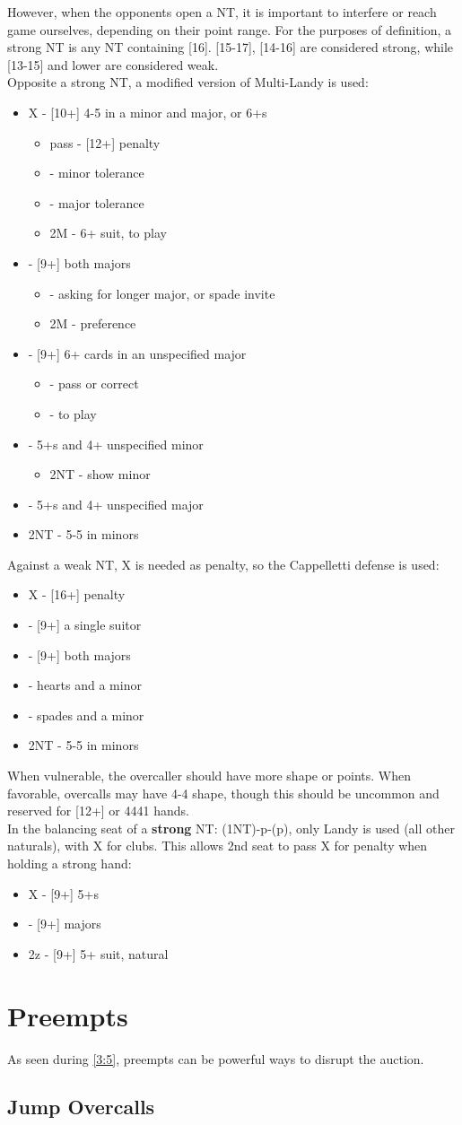 \documentclass[12pt]{report}
\newcommand{\n}{\\}
\newcommand{\ul}[1]{\begin{itemize}#1\end{itemize}}
\newcommand{\li}{\item[~]}
\begin{document}
    However, when the opponents open a NT, it is important to interfere or reach game ourselves, depending on their point range.  For the purposes of definition, a strong NT is any NT containing [16].  [15-17], [14-16] are considered strong, while [13-15] and lower are considered weak. \n

    Opposite a strong NT, a modified version of Multi-Landy is used:
    \ul {
        \li X - [10+] 4-5 in a minor and major, or 6+\di{}s
        \ul {
            \li pass - [12+] penalty
            \li \cl2 - minor tolerance
            \li \di2 - major tolerance
            \li 2M - 6+ suit, to play
        }
        \li \cl2 - [9+] both majors
        \ul {
            \li \di2 - asking for longer major, or spade invite
            \li 2M - preference
        }
        \li \di2 - [9+] 6+ cards in an unspecified major
        \ul {
            \li \he2 - pass or correct
            \li \sp2 - to play
        }
        \li \he2 - 5+\he{}s and 4+ unspecified minor
        \ul {
            \li 2NT - show minor
        }
        \li \sp2 - 5+\sp{}s and 4+ unspecified major
        \li 2NT - 5-5 in minors
    }

    Against a weak NT, X is needed as penalty, so the Cappelletti defense is used:
    \ul {
        \li X - [16+] penalty
        \li {} - [9+] a single suitor
        \li \di2 - [9+] both majors
        \li \he2 - hearts and a minor
        \li \sp2 - spades and a minor
        \li 2NT - 5-5 in minors
    }

    When vulnerable, the overcaller should have more shape or points.  When favorable, overcalls may have 4-4 shape, though this should be uncommon and reserved for [12+] or 4441 hands. \n

    In the balancing seat of a \textbf{strong} NT: (1NT)-p-(p), only Landy is used (all other naturals), with X for clubs.  This allows 2nd seat to pass X for penalty when holding a strong hand:
    \ul {
        \li X - [9+] 5+\cl{}s
        \li {} - [9+] majors
        \li 2z - [9+] 5+ suit, natural
    }

\section{Preempts} \label{4:5}

    As seen during \ref{3:5}, preempts can be powerful ways to disrupt the auction.

\subsection{Jump Overcalls}
    
\end{document}
